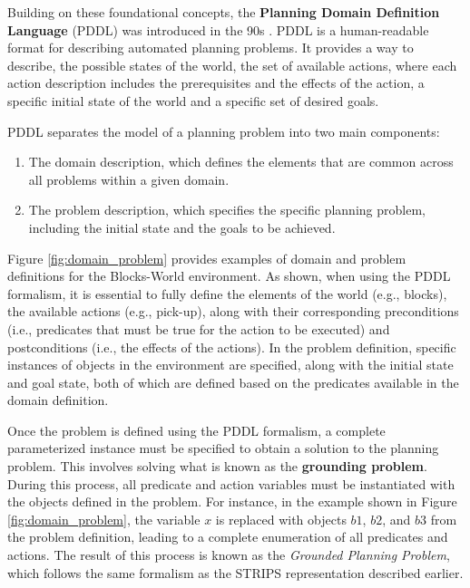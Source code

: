 Building on these foundational concepts, the \textbf{Planning Domain Definition Language} (PDDL) was introduced in the 90s \cite{aeronautiques1998pddl}. PDDL is a human-readable format for describing automated planning problems. It provides a way to describe, the possible states of the world, the set of available actions, where each action description includes the prerequisites and the effects of the action, a specific initial state of the world and a specific set of desired goals. 

PDDL separates the model of a planning problem into two main components:
\begin{enumerate}
    \item The domain description, which defines the elements that are common across all problems within a given domain.
    \item The problem description, which specifies the specific planning problem, including the initial state and the goals to be achieved.
\end{enumerate}



Figure \ref{fig:domain_problem} provides examples of domain and problem definitions for the Blocks-World environment. As shown, when using the PDDL formalism, it is essential to fully define the elements of the world (e.g., blocks), the available actions (e.g., pick-up), along with their corresponding preconditions (i.e., predicates that must be true for the action to be executed) and postconditions (i.e., the effects of the actions). In the problem definition, specific instances of objects in the environment are specified, along with the initial state and goal state, both of which are defined based on the predicates available in the domain definition.

Once the problem is defined using the PDDL formalism, a complete parameterized instance must be specified to obtain a solution to the planning problem. This involves solving what is known as the \textbf{grounding problem}. During this process, all predicate and action variables must be instantiated with the objects defined in the problem. For instance, in the example shown in Figure \ref{fig:domain_problem}, the variable \( x \) is replaced with objects \( b1 \), \( b2 \), and \( b3 \) from the problem definition, leading to a complete enumeration of all predicates and actions. The result of this process is known as the \textit{Grounded Planning Problem}, which follows the same formalism as the STRIPS representation described earlier.


